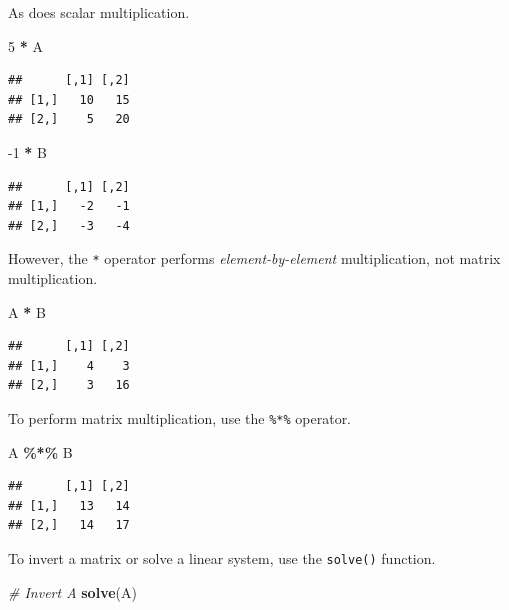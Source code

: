 \documentclass[
  12pt,
  oneside,openany]{book}
\newenvironment{Shaded}{\begin{snugshade}}{\end{snugshade}}
\newcommand{\CommentTok}[1]{\textcolor[rgb]{0.56,0.35,0.01}{\textit{#1}}}
\newcommand{\DecValTok}[1]{\textcolor[rgb]{0.00,0.00,0.81}{#1}}
\newcommand{\KeywordTok}[1]{\textcolor[rgb]{0.13,0.29,0.53}{\textbf{#1}}}
\newcommand{\NormalTok}[1]{#1}
\newcommand{\OperatorTok}[1]{\textcolor[rgb]{0.81,0.36,0.00}{\textbf{#1}}}
\newcommand{\StringTok}[1]{\textcolor[rgb]{0.31,0.60,0.02}{#1}}
\begin{document}
As does scalar multiplication.

\begin{Shaded}
\begin{Highlighting}[]
\DecValTok{5} \OperatorTok{*}\StringTok{ }\NormalTok{A}
\end{Highlighting}
\end{Shaded}

\begin{verbatim}
##      [,1] [,2]
## [1,]   10   15
## [2,]    5   20
\end{verbatim}

\begin{Shaded}
\begin{Highlighting}[]
\DecValTok{{-}1} \OperatorTok{*}\StringTok{ }\NormalTok{B}
\end{Highlighting}
\end{Shaded}

\begin{verbatim}
##      [,1] [,2]
## [1,]   -2   -1
## [2,]   -3   -4
\end{verbatim}

However, the \texttt{*} operator performs \emph{element-by-element} multiplication, not matrix multiplication.

\begin{Shaded}
\begin{Highlighting}[]
\NormalTok{A }\OperatorTok{*}\StringTok{ }\NormalTok{B}
\end{Highlighting}
\end{Shaded}

\begin{verbatim}
##      [,1] [,2]
## [1,]    4    3
## [2,]    3   16
\end{verbatim}

To perform matrix multiplication, use the \texttt{\%*\%} operator.

\begin{Shaded}
\begin{Highlighting}[]
\NormalTok{A }\OperatorTok{\%*\%}\StringTok{ }\NormalTok{B}
\end{Highlighting}
\end{Shaded}

\begin{verbatim}
##      [,1] [,2]
## [1,]   13   14
## [2,]   14   17
\end{verbatim}

To invert a matrix or solve a linear system, use the \texttt{solve()} function.

\begin{Shaded}
\begin{Highlighting}[]
\CommentTok{\# Invert A}
\KeywordTok{solve}\NormalTok{(A)}
\end{Highlighting}
\end{Shaded}
\end{document}
